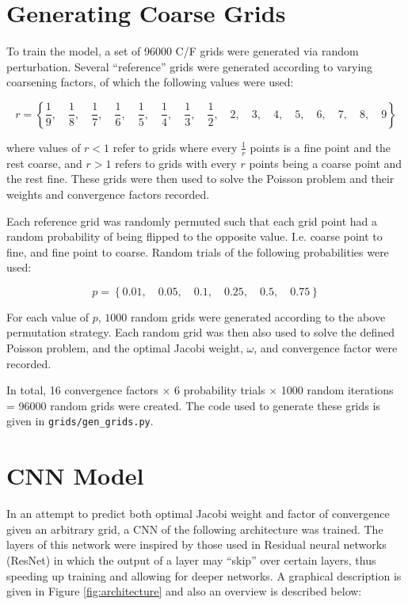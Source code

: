 \section{Generating Coarse Grids}

To train the model, a set of 96000 C/F grids were generated via random perturbation.  Several ``reference'' grids were generated according to varying coarsening factors, of which the following values were used:

$$r = \left\{
\frac{1}{9},\quad
\frac{1}{8},\quad
\frac{1}{7},\quad
\frac{1}{6},\quad
\frac{1}{5},\quad
\frac{1}{4},\quad
\frac{1}{3},\quad
\frac{1}{2},\quad
2,\quad
3,\quad
4,\quad
5,\quad
6,\quad
7,\quad
8,\quad
9
\right\}$$

where values of $r<1$ refer to grids where every $\frac{1}{r}$ points is a fine point and the rest coarse, and $r>1$ refers to grids with every $r$ points being a coarse point and the rest fine.  These grids were then used to solve the Poisson problem and their weights and convergence factors recorded.

Each reference grid was randomly permuted such that each grid point had a random probability of being flipped to the opposite value.  I.e. coarse point to fine, and fine point to coarse.  Random trials of the following probabilities were used:

$$ p = \left\{0.01, \quad 0.05, \quad 0.1, \quad 0.25, \quad 0.5, \quad 0.75\right\} $$

For each value of $p$, $1000$ random grids were generated according to the above permutation strategy.  Each random grid was then also used to solve the defined Poisson problem, and the optimal Jacobi weight, $\omega$, and convergence factor were recorded.

In total, 16 convergence factors $\times$ 6 probability trials $\times$ 1000 random iterations = 96000 random grids were created.  The code used to generate these grids is given in \texttt{grids/gen\_grids.py}.

\section{CNN Model}

In an attempt to predict both optimal Jacobi weight and factor of convergence given an arbitrary grid, a CNN of the following architecture was trained.  The layers of this network were inspired by those used in Residual neural networks (ResNet) in which the output of a layer may ``skip'' over certain layers, thus speeding up training and allowing for deeper networks.  A graphical description is given in Figure \ref{fig:architecture} and also an overview is described below:

